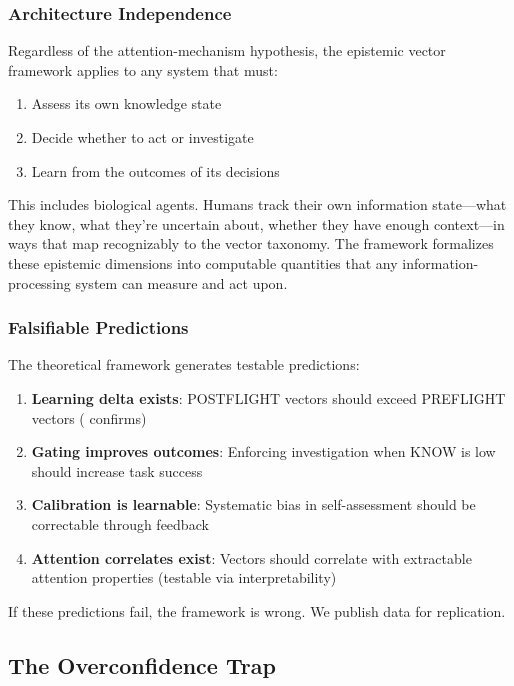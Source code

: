\subsubsection{Architecture Independence}

Regardless of the attention-mechanism hypothesis, the epistemic vector framework applies to any system that must:

\begin{enumerate}
    \item Assess its own knowledge state
    \item Decide whether to act or investigate
    \item Learn from the outcomes of its decisions
\end{enumerate}

This includes biological agents. Humans track their own information state---what they know, what they're uncertain about, whether they have enough context---in ways that map recognizably to the vector taxonomy. The framework formalizes these epistemic dimensions into computable quantities that any information-processing system can measure and act upon.

\subsubsection{Falsifiable Predictions}

The theoretical framework generates testable predictions:

\begin{enumerate}
    \item \textbf{Learning delta exists}: POSTFLIGHT vectors should exceed PREFLIGHT vectors ( confirms)
    \item \textbf{Gating improves outcomes}: Enforcing investigation when KNOW is low should increase task success
    \item \textbf{Calibration is learnable}: Systematic bias in self-assessment should be correctable through feedback
    \item \textbf{Attention correlates exist}: Vectors should correlate with extractable attention properties (testable via interpretability)
\end{enumerate}

If these predictions fail, the framework is wrong. We publish data for replication.

\subsection{The Overconfidence Trap}

